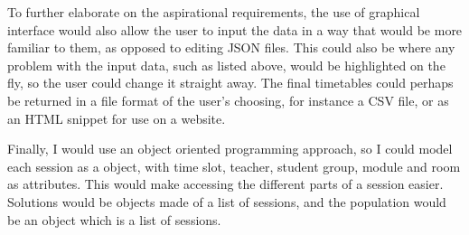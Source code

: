 To further elaborate on the aspirational requirements, the use of graphical 
interface would also allow the user to input the data in a way that would be
more familiar to them, as opposed to editing JSON files.
This could also be where any problem with the input data, such as listed above,
would be highlighted on the fly, so the user could change it straight away.
The final timetables could perhaps be returned in a file format of the user's
choosing, for instance a CSV file, or as an HTML snippet for use on a website.

Finally, I would use an object oriented programming approach, so I could model
each session as a object, with time slot, teacher, student group, module and 
room as attributes.
This would make accessing the different parts of a session easier.
Solutions would be objects made of a list of sessions, and the population would
be an object which is a list of sessions.